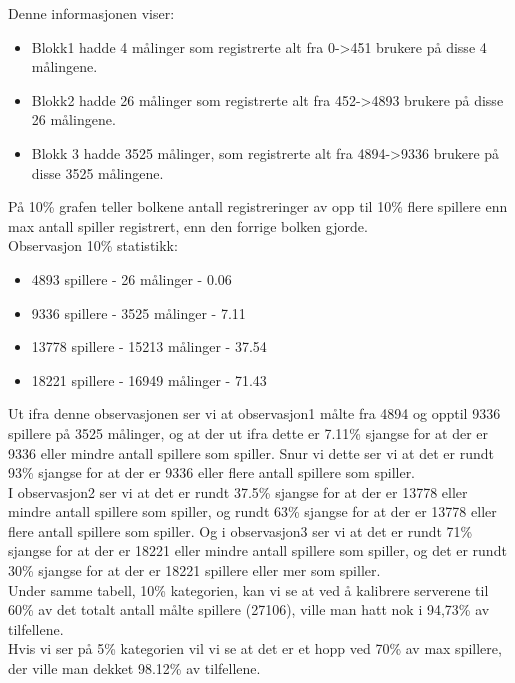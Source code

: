 \documentclass[a4paper, norsk, 12pt]{article}
\begin{document}
Denne informasjonen viser:
\begin{itemize}
\item Blokk1 hadde 4 målinger som registrerte alt fra 0->451 brukere på disse 4 målingene.
\item Blokk2 hadde 26 målinger som registrerte alt fra 452->4893 brukere på disse 26 målingene.
\item Blokk 3 hadde 3525 målinger, som registrerte alt fra 4894->9336 brukere på disse 3525 målingene.
\end{itemize}

På 10\% grafen teller bolkene antall registreringer av opp til 10\% flere spillere enn max antall spiller registrert, enn den forrige bolken gjorde. \\

Observasjon 10\% statistikk:
\begin{itemize}
\item 4893 spillere - 26 målinger - 0.06%
\item 9336 spillere - 3525 målinger - 7.11%
\item 13778 spillere - 15213 målinger - 37.54%
\item 18221 spillere - 16949 målinger - 71.43%
\end{itemize}

Ut ifra denne observasjonen ser vi at observasjon1 målte fra 4894 og opptil 9336 spillere på 3525 målinger, og at der ut ifra dette er 7.11\% sjangse for at der er 9336 eller mindre antall spillere som spiller. Snur vi dette ser vi at det er rundt 93\% sjangse for at der er 9336 eller flere antall spillere som spiller.\\

I observasjon2 ser vi at det er rundt 37.5\% sjangse for at der er 13778 eller mindre antall spillere som spiller, og rundt 63\% sjangse for at der er 13778 eller flere antall spillere som spiller. Og i observasjon3 ser vi at det er rundt 71\% sjangse for at der er 18221 eller mindre antall spillere som spiller, og det er rundt 30\% sjangse for at der er 18221 spillere eller mer som spiller.\\

Under samme tabell, 10\% kategorien, kan vi se at ved å kalibrere serverene til 60\% av det totalt antall målte spillere (27106), ville man hatt nok i 94,73\% av tilfellene. \\

Hvis vi ser på 5\% kategorien vil vi se at det er et hopp ved 70\% av max spillere, der ville man dekket 98.12\% av tilfellene. \\
\end{document}
